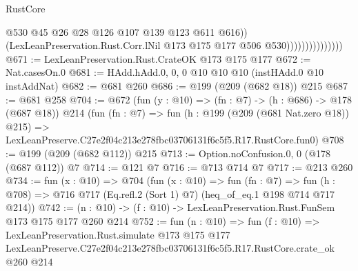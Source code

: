 \begin{lexlean}{RustCore}
\begin{coremodule}
                                    @530
                                    @45
                                    @26
                                    @28
                                    @126
                                    @107
                                    @139
                                    @123
                                    @611
                                    @616))
                                (LexLeanPreservation.Rust.Corr.lNil
                                  @173
                                  @175
                                  @177
                                  @506
                                  @530)))))))))))))))
@671 := LexLeanPreservation.Rust.CrateOK @173 @175 @177
@672 := Nat.casesOn.{0}
@681 := HAdd.hAdd.{0, 0, 0} @10 @10 @10 (instHAdd.{0} @10 instAddNat)
@682 := @681 @260
@686 := @199 (@209 (@682 @18)) @215
@687 := @681 @258
@704 := @672
    (fun (y : @10) => (fn : @7) -> (h : @686) -> @178 (@687 @18))
    @214
    (fun (fn : @7) =>
    fun (h : @199 (@209 (@681 Nat.zero @18)) @215) =>
    LexLeanPreserve.C27e2f04c213e278fbc03706131f6c5f5.R17.RustCore.fun0)
@708 := @199 (@209 (@682 @112)) @215
@713 := Option.noConfusion.{0, 0} (@178 (@687 @112)) @7
@714 := @121 @7
@716 := @713 @714 @7
@717 := @213 @260
@734 := fun (x : @10) =>
  @704
    (fun (x : @10) =>
    fun (fn : @7) =>
    fun (h : @708) => @716 @717 (Eq.refl.{2} (Sort 1) @7) (heq_of_eq.{1} @198 @714 @717 @214))
@742 := (n : @10) -> (f : @10) -> LexLeanPreservation.Rust.FunSem @173 @175 @177 @260 @214
@752 := fun (n : @10) =>
  fun (f : @10) =>
  LexLeanPreservation.Rust.simulate
    @173
    @175
    @177
    LexLeanPreserve.C27e2f04c213e278fbc03706131f6c5f5.R17.RustCore.crate_ok
    @260
    @214
\end{coremodule}
\end{lexlean}
